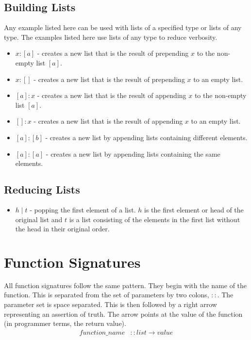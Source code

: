 \documentclass[12pt]{amsart}
\begin{document}
\subsection{Building Lists}
Any example listed here can be used with lists of a specified type or lists of any type. The examples listed here use lists of any type to reduce verbosity.

\begin{itemize}
\item $x:[a]$ - creates a new list that is the result of prepending $x$ to the non-empty list $[a]$.
\item $x:[]$ - creates a new list that is the result of prepending $x$ to an empty list.
\item $[a]:x$ - creates a new list that is the result of appending $x$ to the non-empty list $[a]$.
\item $[]:x$ - creates a new list that is the result of appending $x$ to an empty list.
\item $[a]:[b]$ - creates a new list by appending lists containing different elements.
\item $[a]:[a]$ - creates a new list by appending lists containing the same elements.
\end{itemize}
\subsection{Reducing Lists}

\begin{itemize}
\item $h\mid t$ - popping the first element of a list. $h$ is the first element or head of the original list and $t$ is a list consisting of the elements in the first list without the head in their original order.
\end{itemize}

\section{Function Signatures}
All function signatures follow the same pattern. They begin with the name of the function. This is separated from the set of parameters by two colons, $::$. The parameter set is space separated. This is then followed by a right arrow representing an assertion of truth. The arrow points at the value of the function (in programmer terms, the return value).
\begin{align*}
function\_name&:: list\rightarrow value
\end{align*}
\end{document}

